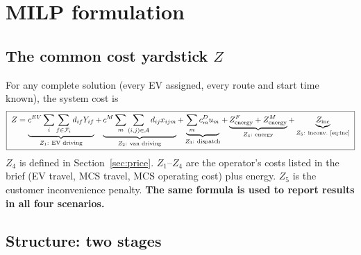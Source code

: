 \documentclass[11pt,a4paper]{article}
\newif\ifSEQ \SEQfalse   %
\newcommand{\I}{\mathcal{I}}
\newcommand{\F}{\mathcal{F}}
\newcommand{\A}{\mathcal{A}}
\begin{document}
\section{MILP formulation}\label{sec:milp}

\subsection{The common cost yardstick $Z$}\label{sec:obj}

For any complete solution (every EV assigned, every route and start time known), the system cost is
\begin{equation}
\boxed{\;
Z=\underbrace{c^{EV}\sum_{i}\sum_{f\in\F_i}d_{if}Y_{if}}_{Z_1:\ \text{EV driving}}
+\underbrace{c^M\sum_{m}\sum_{(i,j)\in\A}d_{ij}x_{ijm}}_{Z_2:\ \text{van driving}}
+\underbrace{\sum_m c^D_m u_m}_{Z_3:\ \text{dispatch}}
+\underbrace{Z^F_{\text{energy}}+Z^M_{\text{energy}}}_{Z_4:\ \text{energy}}
+\underbrace{Z_{\text{inc}}}_{Z_5:\ \text{inconv.\ \eqref{eq:inc}}}
\;}\label{eq:Z}
\end{equation}
$Z_4$ is defined in Section~\ref{sec:price}. $Z_1$--$Z_4$ are the operator's costs listed in the brief (EV travel, MCS travel, MCS operating cost) plus energy. $Z_5$ is the customer inconvenience penalty. \textbf{The same formula is used to report results in all four scenarios.}

\ifSEQ
\subsection{Structure: two stages}

\begin{center}
\end{center}
\end{document}

